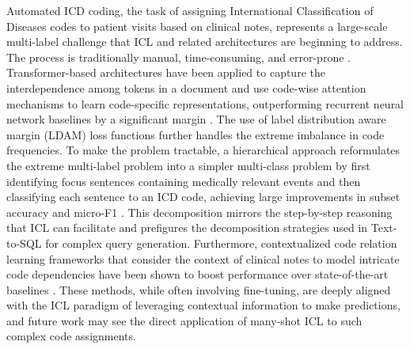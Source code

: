 \documentclass[11pt]{article}
\begin{document}
Automated ICD coding, the task of assigning International Classification of Diseases codes to patient visits based on clinical notes, represents a large-scale multi-label challenge that ICL and related architectures are beginning to address. The process is traditionally manual, time-consuming, and error-prone \cite{ref517}. Transformer-based architectures have been applied to capture the interdependence among tokens in a document and use code-wise attention mechanisms to learn code-specific representations, outperforming recurrent neural network baselines by a significant margin \cite{ref518}. The use of label distribution aware margin (LDAM) loss functions further handles the extreme imbalance in code frequencies. To make the problem tractable, a hierarchical approach reformulates the extreme multi-label problem into a simpler multi-class problem by first identifying focus sentences containing medically relevant events and then classifying each sentence to an ICD code, achieving large improvements in subset accuracy and micro-F1 \cite{ref519}. This decomposition mirrors the step-by-step reasoning that ICL can facilitate and prefigures the decomposition strategies used in Text-to-SQL for complex query generation. Furthermore, contextualized code relation learning frameworks that consider the context of clinical notes to model intricate code dependencies have been shown to boost performance over state-of-the-art baselines \cite{ref520}. These methods, while often involving fine-tuning, are deeply aligned with the ICL paradigm of leveraging contextual information to make predictions, and future work may see the direct application of many-shot ICL to such complex code assignments.
\end{document}
